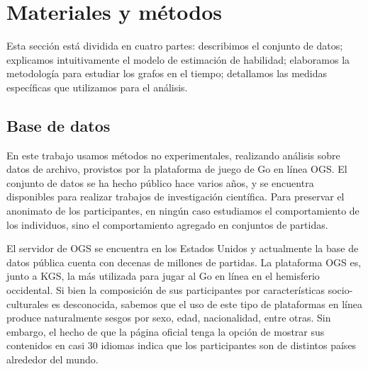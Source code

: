 \documentclass[a4paper,11pt]{book}
\theoremstyle{definition}
\begin{document}
%

\section{Materiales y m\'etodos}

Esta secci\'on est\'a dividida en cuatro partes: describimos el conjunto de datos; explicamos intuitivamente el modelo de estimaci\'on de habilidad; elaboramos la metodolog\'ia para estudiar los grafos en el tiempo; detallamos las medidas espec\'ificas que utilizamos para el an\'alisis.

\subsection{Base de datos}

En este trabajo usamos m\'etodos no experimentales, realizando an\'alisis sobre datos de archivo, provistos por la plataforma de juego de Go en l\'inea OGS.
%
El conjunto de datos se ha hecho p\'ublico hace varios a\~nos, y se encuentra disponibles para realizar trabajos de investigaci\'on cient\'ifica.
%
Para preservar el anonimato de los participantes, en ning\'un caso estudiamos el comportamiento de los individuos, sino el comportamiento agregado en conjuntos de partidas.


El servidor de OGS se encuentra en los Estados Unidos y actualmente la base de datos p\'ublica cuenta con decenas de millones de partidas.
%
La plataforma OGS es, junto a KGS, la m\'as utilizada para jugar al Go en l\'inea en el hemisferio occidental.
%
Si bien la composici\'on de sus participantes por caracter\'isticas socio-culturales es desconocida, sabemos que el uso de este tipo de plataformas en l\'inea produce naturalmente sesgos por sexo, edad, nacionalidad, entre otras.
%
Sin embargo, el hecho de que la p\'agina oficial tenga la opci\'on de mostrar sus contenidos en casi $30$ idiomas indica que los participantes son de distintos pa\'ises alrededor del mundo.

\end{document}
